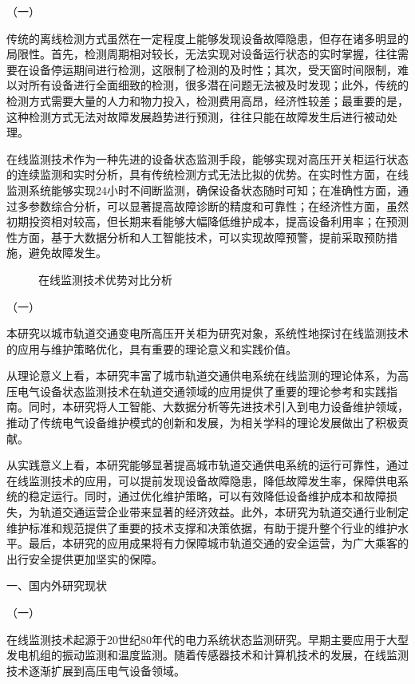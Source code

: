 （一）

传统的离线检测方式虽然在一定程度上能够发现设备故障隐患，但存在诸多明显的局限性。首先，检测周期相对较长，无法实现对设备运行状态的实时掌握，往往需要在设备停运期间进行检测，这限制了检测的及时性；其次，受天窗时间限制，难以对所有设备进行全面细致的检测，很多潜在问题无法被及时发现；此外，传统的检测方式需要大量的人力和物力投入，检测费用高昂，经济性较差；最重要的是，这种检测方式无法对故障发展趋势进行预测，往往只能在故障发生后进行被动处理。

在线监测技术作为一种先进的设备状态监测手段，能够实现对高压开关柜运行状态的连续监测和实时分析，具有传统检测方式无法比拟的优势。在实时性方面，在线监测系统能够实现24小时不间断监测，确保设备状态随时可知；在准确性方面，通过多参数综合分析，可以显著提高故障诊断的精度和可靠性；在经济性方面，虽然初期投资相对较高，但长期来看能够大幅降低维护成本，提高设备利用率；在预测性方面，基于大数据分析和人工智能技术，可以实现故障预警，提前采取预防措施，避免故障发生。

\begin{figure}[h]
\centering
\caption{在线监测技术优势对比分析}
\label{fig:monitoring_advantage}
\end{figure}

（一）

本研究以城市轨道交通变电所高压开关柜为研究对象，系统性地探讨在线监测技术的应用与维护策略优化，具有重要的理论意义和实践价值。

从理论意义上看，本研究丰富了城市轨道交通供电系统在线监测的理论体系，为高压电气设备状态监测技术在轨道交通领域的应用提供了重要的理论参考和实践指南。同时，本研究将人工智能、大数据分析等先进技术引入到电力设备维护领域，推动了传统电气设备维护模式的创新和发展，为相关学科的理论发展做出了积极贡献。

从实践意义上看，本研究能够显著提高城市轨道交通供电系统的运行可靠性，通过在线监测技术的应用，可以提前发现设备故障隐患，降低故障发生率，保障供电系统的稳定运行。同时，通过优化维护策略，可以有效降低设备维护成本和故障损失，为轨道交通运营企业带来显著的经济效益。此外，本研究为轨道交通行业制定维护标准和规范提供了重要的技术支撑和决策依据，有助于提升整个行业的维护水平。最后，本研究的应用成果将有力保障城市轨道交通的安全运营，为广大乘客的出行安全提供更加坚实的保障。

一、国内外研究现状

（一）

在线监测技术起源于20世纪80年代的电力系统状态监测研究。早期主要应用于大型发电机组的振动监测和温度监测。随着传感器技术和计算机技术的发展，在线监测技术逐渐扩展到高压电气设备领域。

